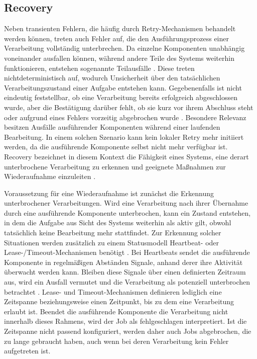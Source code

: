 \subsection{Recovery}
\label{subsec:recovery}
Neben transienten Fehlern, die häufig durch Retry-Mechanismen behandelt werden können, treten auch Fehler auf,
die den Ausführungsprozess einer Verarbeitung vollständig unterbrechen.
Da einzelne Komponenten unabhängig voneinander ausfallen können, während andere Teile des Systems weiterhin funktionieren,
entstehen sogenannte Teilausfälle \parencite[Kap.~8 Abschnitt \glqq Faults and Partial Failures\grqq]{kleppmann_designing_2017}.
Diese treten nichtdeterministisch auf, wodurch Unsicherheit über den tatsächlichen Verarbeitungszustand einer Aufgabe entstehen kann.
Gegebenenfalls ist nicht eindeutig feststellbar, ob eine Verarbeitung bereits erfolgreich abgeschlossen wurde, aber die
Bestätigung darüber fehlt, ob sie kurz vor ihrem Abschluss steht oder aufgrund eines Fehlers vorzeitig abgebrochen wurde
\parencite[Kap.~8]{kleppmann_designing_2017}.
Besondere Relevanz besitzen Ausfälle ausführender Komponenten während einer laufenden Bearbeitung.
In einem solchen Szenario kann kein lokaler Retry mehr initiiert werden, da die ausführende Komponente selbst nicht mehr verfügbar ist.
Recovery bezeichnet in diesem Kontext die Fähigkeit eines Systems, eine derart unterbrochene Verarbeitung zu erkennen und
geeignete Maßnahmen zur Wiederaufnahme einzuleiten \parencite[Kap.~4.2]{bass_software_2021}.

Voraussetzung für eine Wiederaufnahme ist zunächst die Erkennung unterbrochener Verarbeitungen.
Wird eine Verarbeitung nach ihrer Übernahme durch eine ausführende Komponente unterbrochen, kann ein Zustand entstehen, in
dem die Aufgabe aus Sicht des Systems weiterhin als aktiv gilt, obwohl tatsächlich keine Bearbeitung mehr stattfindet.
Zur Erkennung solcher Situationen werden zusätzlich zu einem Statusmodell Heartbeat- oder Lease-/Timeout-Mechanismen benötigt
\parencite[Kap.~17.2 Abschnitt \glqq Failure in the Cloud\grqq]{bass_software_2021}.
Bei Heartbeats sendet die ausführende Komponente in regelmäßigen Abständen Signale, anhand derer ihre Aktivität überwacht werden kann.
Bleiben diese Signale über einen definierten Zeitraum aus, wird ein Ausfall vermutet und die Verarbeitung als potenziell
unterbrochen betrachtet \parencite[Kap.~4.2 Abschnitt \glqq Detect Faults\grqq]{bass_software_2021}.
Lease- und Timeout-Mechanismen definieren lediglich eine Zeitspanne beziehungsweise einen Zeitpunkt, bis zu dem eine Verarbeitung erlaubt ist.
Beendet die ausführende Komponente die Verarbeitung nicht innerhalb dieses Rahmens, wird der Job als fehlgeschlagen interpretiert.
Ist die Zeitspanne nicht passend konfiguriert, werden daher auch Jobs abgebrochen, die zu lange gebraucht haben, auch wenn
bei deren Verarbeitung kein Fehler aufgetreten ist.

